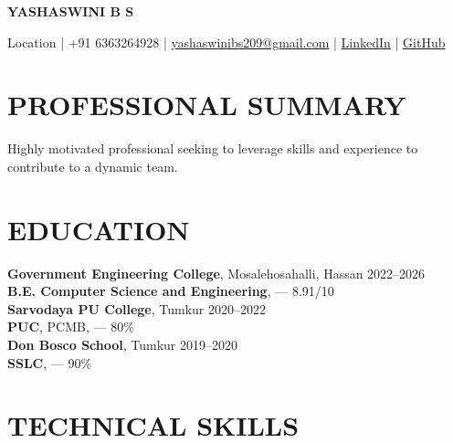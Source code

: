 \documentclass[9pt,a4paper]{extarticle}
\begin{document}

\begin{center}

{\Large \textbf{YASHASWINI B S}}

\vspace{1pt}

Location |
+91 6363264928 |
\href{mailto:yashaswinibs209@gmail.com}{yashaswinibs209@gmail.com} |
\href{https://linkedin.com/in/yashaswini-b-s-b995a7330}{LinkedIn} |
\href{https://github.com/yashaswini-s-naik}{GitHub}

\end{center}


\section*{PROFESSIONAL SUMMARY}

Highly motivated professional seeking to leverage skills and experience to contribute to a dynamic team.


\section*{EDUCATION}

\noindent \textbf{Government Engineering College}, Mosalehosahalli, Hassan \hfill 2022–2026\vspace{2pt}\\
\noindent \textbf{B.E. Computer Science and Engineering}, — \hfill 8.91/10\vspace{2pt}\\
\noindent \textbf{Sarvodaya PU College}, Tumkur \hfill 2020–2022\vspace{2pt}\\
\noindent \textbf{PUC}, PCMB, — \hfill 80\%\vspace{2pt}\\
\noindent \textbf{Don Bosco School}, Tumkur \hfill 2019–2020\vspace{2pt}\\
\noindent \textbf{SSLC}, — \hfill 90\%\vspace{2pt}\\



\section*{TECHNICAL SKILLS}
\end{document}
